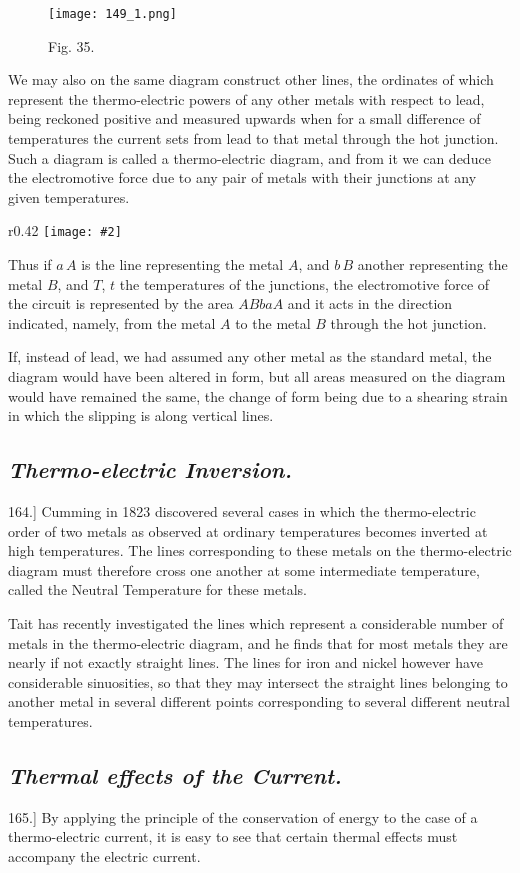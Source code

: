 \documentclass[12pt,oneside]{book}[2021/10/04]
\newcommand{\Heading}{\centering\normalfont}
\newcommand{\Subsection}[1]{\subsection*{\normalsize\Heading\itshape #1}}
\newcommand{\Runhead}[1]{\fancyhead[C]{\iffloatpage{}{\small#1}}}
\newcommand{\article}[1]{\phantomsection \label{art:#1}{#1.]}}
\newcommand{\wrapfig}[3]{
\begin{wrapfigure}{r}{#1\textwidth}
\centering
\texttt{[image: \#2]}
\caption*{\small #3}
\end{wrapfigure}}
\newcommand{\¬}{\hphantom{0}}
\begin{document}
\begin{figure}[H]
\centering
\texttt{[image: 149\_1.png]}
\caption*{\small Fig. 35.}
\end{figure}
We may also on the same diagram construct other lines, the
ordinates of which represent the thermo-electric powers of any
other metals with respect to lead, being reckoned positive and
measured upwards when for a small difference of temperatures
the current sets from lead to that metal through the hot junction.
Such a diagram is called a thermo-electric diagram, and from it
we can deduce the electromotive force due to any pair of metals
with their junctions at any given temperatures.

\wrapfig{0.42}{150.png}{Fig. 36.}
Thus if \(a\,A\) is the line representing the metal \(A\), and \(b\,B\) another
representing the metal \(B\), and \(T\), \(t\) the
temperatures of the junctions, the
electromotive force of the circuit is
represented by the area \(ABbaA\) and
it acts in the direction indicated,
namely, from the metal \(A\) to the
metal \(B\) through the hot junction.

If, instead of lead, we had assumed
any other metal as the standard
metal, the diagram would have been
altered in form, but all areas measured
on the diagram would have remained
the same, the change of form being
due to a shearing strain in which the slipping is along vertical
lines.

\Subsection{Thermo-electric Inversion.}

\article{164} Cumming in 1823 discovered several cases in which the
thermo-electric order of two metals as observed at ordinary temperatures
becomes inverted at high temperatures. The lines corresponding
to these metals on the thermo-electric diagram must
therefore cross one another at some intermediate temperature, called
the Neutral Temperature for these metals.

Tait has recently investigated the lines which represent a considerable
number of metals in the thermo-electric diagram, and he
finds that for most metals they are nearly if not exactly straight
lines. The lines for iron and nickel however have considerable
sinuosities, so that they may intersect the straight lines belonging
to another metal in several different points corresponding to several
different neutral temperatures.
\Runhead{THERMO-ELECTRIC INVERSION.}

\Subsection{Thermal effects of the Current.}

\article{165} By applying the principle of the conservation of energy to
the case of a thermo-electric current, it is easy to see that certain
thermal effects must accompany the electric current.
\end{document}

